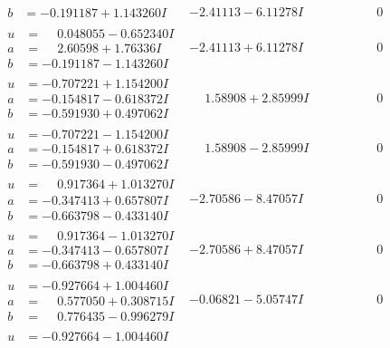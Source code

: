 \documentclass[1p]{elsarticle_modified}
\theoremstyle{definition}
\begin{document}
$$\begin{array}{c|c|c}
\begin{aligned}
b &= -0.191187 + 1.143260 I\end{aligned}
 & -2.41113 - 6.11278 I & \phantom{-0.000000 } 0 \\ \hline\begin{aligned}
u &= \phantom{-}0.048055 - 0.652340 I \\
a &= \phantom{-}2.60598 + 1.76336 I \\
b &= -0.191187 - 1.143260 I\end{aligned}
 & -2.41113 + 6.11278 I & \phantom{-0.000000 } 0 \\ \hline\begin{aligned}
u &= -0.707221 + 1.154200 I \\
a &= -0.154817 - 0.618372 I \\
b &= -0.591930 + 0.497062 I\end{aligned}
 & \phantom{-}1.58908 + 2.85999 I & \phantom{-0.000000 } 0 \\ \hline\begin{aligned}
u &= -0.707221 - 1.154200 I \\
a &= -0.154817 + 0.618372 I \\
b &= -0.591930 - 0.497062 I\end{aligned}
 & \phantom{-}1.58908 - 2.85999 I & \phantom{-0.000000 } 0 \\ \hline\begin{aligned}
u &= \phantom{-}0.917364 + 1.013270 I \\
a &= -0.347413 + 0.657807 I \\
b &= -0.663798 - 0.433140 I\end{aligned}
 & -2.70586 - 8.47057 I & \phantom{-0.000000 } 0 \\ \hline\begin{aligned}
u &= \phantom{-}0.917364 - 1.013270 I \\
a &= -0.347413 - 0.657807 I \\
b &= -0.663798 + 0.433140 I\end{aligned}
 & -2.70586 + 8.47057 I & \phantom{-0.000000 } 0 \\ \hline\begin{aligned}
u &= -0.927664 + 1.004460 I \\
a &= \phantom{-}0.577050 + 0.308715 I \\
b &= \phantom{-}0.776435 - 0.996279 I\end{aligned}
 & -0.06821 - 5.05747 I & \phantom{-0.000000 } 0 \\ \hline\begin{aligned}
u &= -0.927664 - 1.004460 I \\

\end{aligned}
\end{array}$$
\end{document}
